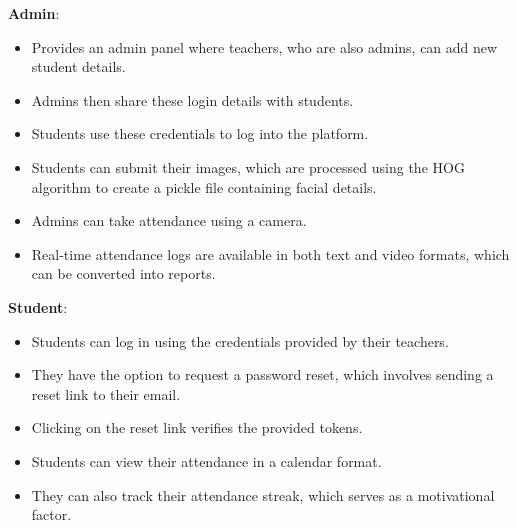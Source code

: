 \textbf{Admin}: 
\begin{itemize}

    \item Provides an admin panel where teachers, who are also admins, can add new student details.
    \item Admins then share these login details with students.
    \item Students use these credentials to log into the platform.
    \item Students can submit their images, which are processed using the HOG algorithm to create a pickle file containing facial details.
    \item Admins can take attendance using a camera.
    \item Real-time attendance logs are available in both text and video formats, which can be converted into reports.
\end{itemize}

\textbf{Student}: 
\begin{itemize}

    \item Students can log in using the credentials provided by their teachers.
    \item They have the option to request a password reset, which involves sending a reset link to their email.
    \item Clicking on the reset link verifies the provided tokens.
    \item Students can view their attendance in a calendar format.
    \item They can also track their attendance streak, which serves as a motivational factor.
\end{itemize}
